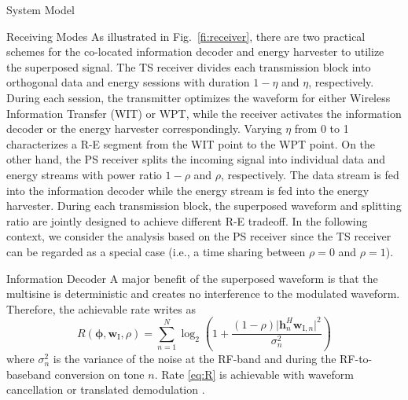 \documentclass[journal]{IEEEtran}
\begin{document}
\begin{section}{System Model}
\begin{subsection}{Receiving Modes}
			As illustrated in Fig.~\ref{fi:receiver}, there are two practical schemes for the co-located information decoder and energy harvester \cite{Zhou2013} to utilize the superposed signal. The TS receiver divides each transmission block into orthogonal data and energy sessions with duration $1-\eta$ and $\eta$, respectively. During each session, the transmitter optimizes the waveform for either Wireless Information Transfer (WIT) or WPT, while the receiver activates the information decoder or the energy harvester correspondingly. Varying $\eta$ from \num{0} to \num{1} characterizes a R-E segment from the WIT point to the WPT point. On the other hand, the PS receiver splits the incoming signal into individual data and energy streams with power ratio $1-\rho$ and $\rho$, respectively. The data stream is fed into the information decoder while the energy stream is fed into the energy harvester. During each transmission block, the superposed waveform and splitting ratio are jointly designed to achieve different R-E tradeoff. In the following context, we consider the analysis based on the PS receiver since the TS receiver can be regarded as a special case (i.e., a time sharing between $\rho=0$ and $\rho=1$).
		\end{subsection}


		\begin{subsection}{Information Decoder}
			A major benefit of the superposed waveform is that the multisine is deterministic and creates no interference to the modulated waveform. Therefore, the achievable rate writes as
			\begin{equation}\label{eq:R}
				R(\boldsymbol{\phi},\boldsymbol{w}_{\mathrm{I}},\rho) = \sum_{n=1}^N{\log_2\left(1+\frac{(1-\rho)\lvert \boldsymbol{h}_{n}^H\boldsymbol{w}_{\mathrm{I},n} \rvert^2}{\sigma_n^2}\right)}
			\end{equation}
			where $\sigma_n^2$ is the variance of the noise at the RF-band and during the RF-to-baseband conversion on tone $n$. Rate \eqref{eq:R} is achievable with waveform cancellation or translated demodulation \cite{Clerckx2018b}.
		\end{subsection}



\end{section}
\end{document}
